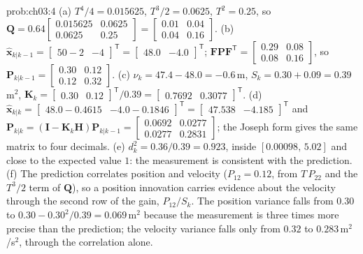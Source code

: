\begin{sol}{prob:ch03:4}
(a) $T^{4}/4=0.015625$, $T^{3}/2=0.0625$, $T^{2}=0.25$, so $\mathbf{Q}=0.64\begin{bmatrix}0.015625&0.0625\\0.0625&0.25\end{bmatrix}=\begin{bmatrix}0.01&0.04\\0.04&0.16\end{bmatrix}$.
(b) $\widehat{\mathbf{x}}_{k|k-1}=\begin{bmatrix}50-2&-4\end{bmatrix}^{\mathsf T}=\begin{bmatrix}48.0&-4.0\end{bmatrix}^{\mathsf T}$; $\mathbf{F}\mathbf{P}\mathbf{F}^{\mathsf T}=\begin{bmatrix}0.29&0.08\\0.08&0.16\end{bmatrix}$, so $\mathbf{P}_{k|k-1}=\begin{bmatrix}0.30&0.12\\0.12&0.32\end{bmatrix}$.
(c) $\nu_k=47.4-48.0=-0.6$\,m, $S_k=0.30+0.09=0.39$\,m$^{2}$, $\mathbf{K}_k=\begin{bmatrix}0.30&0.12\end{bmatrix}^{\mathsf T}/0.39=\begin{bmatrix}0.7692&0.3077\end{bmatrix}^{\mathsf T}$.
(d) $\widehat{\mathbf{x}}_{k|k}=\begin{bmatrix}48.0-0.4615&-4.0-0.1846\end{bmatrix}^{\mathsf T}=\begin{bmatrix}47.538&-4.185\end{bmatrix}^{\mathsf T}$ and\allowbreak $\mathbf{P}_{k|k}=(\mathbf{I}-\mathbf{K}_k\mathbf{H})\mathbf{P}_{k|k-1}=\begin{bmatrix}0.0692&0.0277\\0.0277&0.2831\end{bmatrix}$; the Joseph form gives the same matrix to four decimals.
(e) $d_k^{2}=0.36/0.39=0.923$, inside $[0.00098,\,5.02]$ and close to the expected value $1$: the measurement is consistent with the prediction.
(f) The prediction correlates position and velocity ($P_{12}=0.12$, from $T\,P_{22}$ and the $T^{3}/2$ term of $\mathbf{Q}$), so a position innovation carries evidence about the velocity through the second row of the gain, $P_{12}/S_k$. The position variance falls from $0.30$ to $0.30-0.30^{2}/0.39=0.069$\,m$^{2}$ because the measurement is three times more precise than the prediction; the velocity variance falls only from $0.32$ to $0.283$\,m$^{2}$/s$^{2}$, through the correlation alone.
\end{sol}

